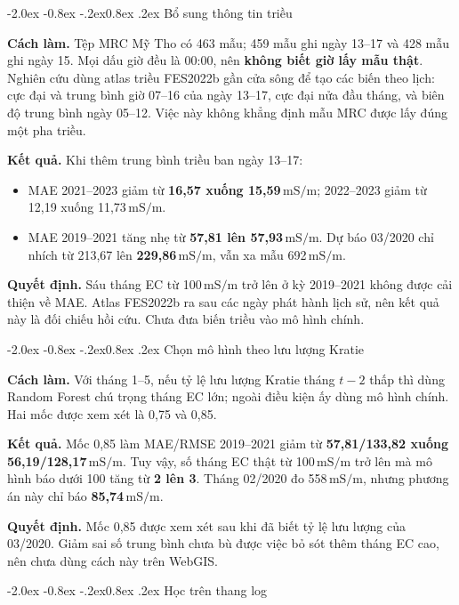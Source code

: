 \documentclass[12pt,a4paper,oneside]{report}
\makeatletter
\newcommand{\ms}{\ensuremath{\,\mathrm{mS/m}}}
\renewcommand\section{\@startsection{section}{1}{\z@}%
  {-2.0ex \@plus -0.8ex \@minus -.2ex}{0.8ex \@plus .2ex}%
  {\normalfont\large\bfseries\color{mainteal}}}
\makeatother
\begin{document}
\section{Bổ sung thông tin triều}

\textbf{Cách làm.} Tệp MRC Mỹ Tho có 463 mẫu; 459 mẫu ghi ngày 13--17 và 428 mẫu ghi ngày 15. Mọi dấu giờ đều là 00:00, nên \textbf{không biết giờ lấy mẫu thật}. Nghiên cứu dùng atlas triều FES2022b gần cửa sông để tạo các biến theo lịch: cực đại và trung bình giờ 07--16 của ngày 13--17, cực đại nửa đầu tháng, và biên độ trung bình ngày 05--12. Việc này không khẳng định mẫu MRC được lấy đúng một pha triều.

\textbf{Kết quả.} Khi thêm trung bình triều ban ngày 13--17:
\begin{itemize}
  \item MAE 2021--2023 giảm từ \textbf{16,57 xuống 15,59\ms}; 2022--2023 giảm từ 12,19 xuống 11,73\ms.
  \item MAE 2019--2021 tăng nhẹ từ \textbf{57,81 lên 57,93\ms}. Dự báo 03/2020 chỉ nhích từ 213,67 lên \textbf{229,86\ms}, vẫn xa mẫu 692\ms.
\end{itemize}
\textbf{Quyết định.} Sáu tháng EC từ 100\ms{} trở lên ở kỳ 2019--2021 không được cải thiện về MAE. Atlas FES2022b ra sau các ngày phát hành lịch sử, nên kết quả này là đối chiếu hồi cứu. Chưa đưa biến triều vào mô hình chính.

\section{Chọn mô hình theo lưu lượng Kratie}

\textbf{Cách làm.} Với tháng 1--5, nếu tỷ lệ lưu lượng Kratie tháng $t-2$ thấp thì dùng Random Forest chú trọng tháng EC lớn; ngoài điều kiện ấy dùng mô hình chính. Hai mốc được xem xét là 0,75 và 0,85.

\textbf{Kết quả.} Mốc 0,85 làm MAE/RMSE 2019--2021 giảm từ \textbf{57,81/133,82 xuống 56,19/128,17\ms}. Tuy vậy, số tháng EC thật từ 100\ms{} trở lên mà mô hình báo dưới 100 tăng từ \textbf{2 lên 3}. Tháng 02/2020 đo 558\ms, nhưng phương án này chỉ báo \textbf{85,74\ms}.

\textbf{Quyết định.} Mốc 0,85 được xem xét sau khi đã biết tỷ lệ lưu lượng của 03/2020. Giảm sai số trung bình chưa bù được việc bỏ sót thêm tháng EC cao, nên chưa dùng cách này trên WebGIS.

\section{Học trên thang log}
\end{document}
